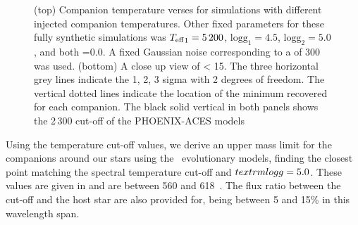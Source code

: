 \begin{figure}
    \centering
    \caption{(top) Companion temperature verses \textchisquared{} for simulations with different injected companion temperatures. Other fixed parameters for these fully synthetic simulations was \({T_{\mathrm{eff}}}_{1}=5\,200\)\K{}, \(\textrm{logg}_1=4.5\), \(\textrm{logg}_2=5.0\), and both \feh{}=0.0. A fixed Gaussian noise corresponding to a \snr{} of 300 was used.
       (bottom) A close up view of \textchisquared{} < 15. The three horizontal grey lines indicate the 1, 2, 3 sigma with 2 degrees of freedom. The vertical dotted lines indicate the location of the minimum \textchisquared{} recovered for each companion. The black solid vertical in both panels shows the 2\,300\K{} cut-off of the {PHOENIX-ACES} models}
    \label{fig:injection_shape}
\end{figure}




Using the temperature cut-off values, we derive an upper mass limit for the companions around our stars using the~\citet{baraffe_new_2015} evolutionary models, finding the closest point matching the spectral temperature cut-off and \(textrm{logg}{}=5.0\). These values are given in  and are between 560 and 618~\Mjup{}. The flux ratio between the cut-off and the host star are also provided for, being between 5 and 15\% in this wavelength span.







